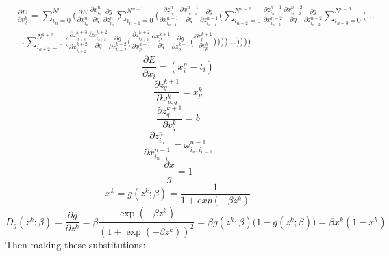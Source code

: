 \documentclass{amsart}
\begin{document}
\begin{equation*}
\begin{aligned}
&\frac{\partial E}{\partial v_q^k} = \sum_{i_n = 0}^{N^n} \Bigg( \frac{\partial E}{\partial x_{i_n}^n}
\frac{\partial x_{i_n}^n}{\partial g} \frac{\partial g}{\partial z_{i_n}^n} \sum_{i_{n-1}=0}^{N^{n-1}} \Bigg(
\frac{\partial z_{i_n}^n}{\partial x_{i_{n-1}}^{n-1}} \frac{\partial x_{i_{n-1}}^{n-1}}{\partial g}
\frac{\partial g}{\partial z_{i_{n-1}}^{n-1}} \Bigg( \sum_{i_{n-2}=0}^{N^{n-2}}
\frac{\partial z_{i_{n-1}}^{n-1}}{\partial x_{i_{n-2}}^{n-2}}
\frac{\partial x_{i_{n-2}}^{n-2}}{\partial g} \frac{\partial g}{\partial z_{i_{n-2}}^{n-2}}
\sum_{i_{n-3}=0}^{N^{n-3}} \Bigg( \ldots\\
&\ldots \sum_{i_{k+2}=0}^{N^{k+2}} \Bigg( \frac{\partial z_{i_{k+3}}^{k+3}}{\partial x_{i_{k+2}}^{k+2}}
\frac{\partial x_{i_{k+2}}^{k+2}}{\partial g}
\frac{\partial g}{\partial z_{k+2}^{k+2}} \Bigg( \frac{\partial z_{i_{k+2}}^{k+2}}{\partial x_p^{k+1}}
\frac{\partial x_p^{k+1}}{\partial g}
\frac{\partial g}{\partial z_p^{k+1}} \Bigg(
\frac{\partial z_p^{k+1}}{\partial v_p^k} \Bigg)\Bigg)\Bigg)\Bigg) \ldots \Bigg)\Bigg)\Bigg)\Bigg)
\end{aligned}
\end{equation*}
%
\begin{equation*}
\frac{\partial E}{\partial x_i} = (x_i^n - t_i)
\end{equation*}
%
\begin{equation*}
\frac{\partial z_q^{k+1}}{\partial \omega_{p,q}^k} = x_p^k
\end{equation*}
%
\begin{equation*}
\frac{\partial z_q^{k+1}}{\partial v_q^k} = b
\end{equation*}
%
\begin{equation*}
\frac{\partial z_{i_n}^{n}}{\partial x_{i_{n-1}}^{n-1}} = \omega_{i_{n},i_{n-1}}^{n-1}
\end{equation*}
%
\begin{equation*}
\frac{\partial x}{g} = 1
\end{equation*}
%
\begin{equation*}
x^k = g(z^k;\beta) = \frac{1}{1 + exp(-\beta z^k )}
\end{equation*}
%
\begin{equation*}
D_g(z^k;\beta) = \frac{\partial g}{\partial z^k} = \beta \frac{\exp(-\beta z^k)}{(1 + \exp(-\beta z^k))^2} = \beta g(z^k; \beta) \big( 1 - g(z^k; \beta)) = \beta x^k (1 - x^k)
\end{equation*}
%
Then making these substitutions:
\end{document}
